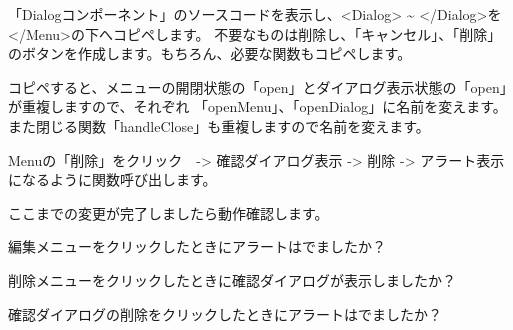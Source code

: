 「Dialogコンポーネント」のソースコードを表示し、\textless{}Dialog\textgreater{} \textasciitilde{} \textless{}/Dialog\textgreater{}を\textless{}/Menu\textgreater{}の下へコピペします。
不要なものは削除し、「キャンセル」、「削除」のボタンを作成します。もちろん、必要な関数もコピペします。

\vspace*{\baselineskip}

コピペすると、メニューの開閉状態の「open」とダイアログ表示状態の「open」が重複しますので、それぞれ
「openMenu」、「openDialog」に名前を変えます。また閉じる関数「handleClose」も重複しますので名前を変えます。

\vspace*{\baselineskip}

Menuの「削除」をクリック　{-}\textgreater{} 確認ダイアログ表示 {-}\textgreater{} 削除 {-}\textgreater{} アラート表示になるように関数呼び出します。

\vspace*{\baselineskip}

ここまでの変更が完了しましたら動作確認します。

\begin{starteritemize}
\item 編集メニューをクリックしたときにアラートはでましたか？
\item 削除メニューをクリックしたときに確認ダイアログが表示しましたか？
\item 確認ダイアログの削除をクリックしたときにアラートはでましたか？
\end{starteritemize}


\clearpage

